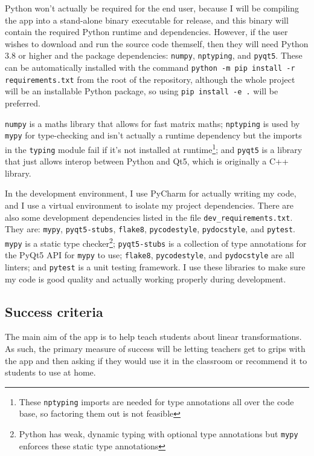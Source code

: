 \documentclass[../main.tex]{subfiles}
\begin{document}
Python won't actually be required for the end user, because I will be compiling the app into a stand-alone binary executable for release, and this binary will contain the required Python runtime and dependencies. However, if the user wishes to download and run the source code themself, then they will need Python 3.8 or higher and the package dependencies: \texttt{numpy}, \texttt{nptyping}, and \texttt{pyqt5}. These can be automatically installed with the command \texttt{python -m pip install -r requirements.txt} from the root of the repository, although the whole project will be an installable Python package, so using \texttt{pip install -e .} will be preferred.

\texttt{numpy} is a maths library that allows for fast matrix maths; \texttt{nptyping} is used by \texttt{mypy} for type-checking and isn't actually a runtime dependency but the imports in the \texttt{typing} module fail if it's not installed at runtime\footnote{These \texttt{nptyping} imports are needed for type annotations all over the code base, so factoring them out is not feasible}; and \texttt{pyqt5} is a library that just allows interop between Python and Qt5, which is originally a C++ library.

In the development environment, I use PyCharm for actually writing my code, and I use a virtual environment to isolate my project dependencies. There are also some development dependencies listed in the file \texttt{dev\_requirements.txt}. They are: \texttt{mypy}, \texttt{pyqt5-stubs}, \texttt{flake8}, \texttt{pycodestyle}, \texttt{pydocstyle}, and \texttt{pytest}. \texttt{mypy} is a static type checker\footnote{Python has weak, dynamic typing with optional type annotations but \texttt{mypy} enforces these static type annotations}; \texttt{pyqt5-stubs} is a collection of type annotations for the PyQt5 API for \texttt{mypy} to use; \texttt{flake8}, \texttt{pycodestyle}, and \texttt{pydocstyle} are all linters; and \texttt{pytest} is a unit testing framework. I use these libraries to make sure my code is good quality and actually working properly during development.

\subsection{Success criteria\label{analysis:success-criteria}}

The main aim of the app is to help teach students about linear transformations. As such, the primary measure of success will be letting teachers get to grips with the app and then asking if they would use it in the classroom or recommend it to students to use at home.
\end{document}
